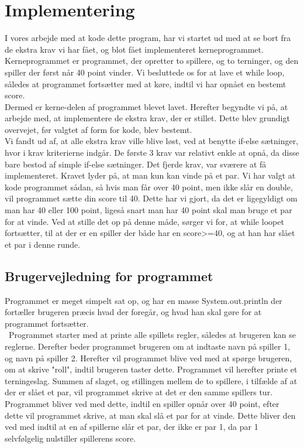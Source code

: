 \chapter{Implementering}
    I vores arbejde med at kode dette program, har vi startet ud med at 
    se bort fra de ekstra krav vi har fået, og blot fået implementeret kerneprogrammet.
    \\ Kerneprogrammet er programmet, der opretter to spillere, 
    og to terninger, og den spiller der først når 40 point vinder. 
    Vi besluttede os for at lave et while loop, således at programmet fortsætter med at køre,
    indtil vi har opnået en bestemt score.
    \\ Dermed er kerne-delen af programmet blevet lavet. 
    Herefter begyndte vi på, at arbejde med, at implementere de ekstra krav, der
    er stillet. 
    Dette blev grundigt overvejet, før valgtet af form for kode, blev bestemt.
    \\ Vi fandt ud af, at alle ekstra krav ville blive løst, ved at benytte if-else sætninger,
    hvor i krav kriterierne indgår.
    De første 3 krav var relativt enkle at opnå, da disse bare bestod af simple
    if-else sætninger.
    Det fjerde krav, var sværere at få implementeret. Kravet lyder på, at man kun kan vinde på et par.
    Vi har valgt at kode programmet sådan, så hvis man får over 40 point, 
    men ikke slår en double, vil programmet sætte din score til 40.
    Dette har vi gjort, da det er ligegyldigt om man har 40 eller 100 point,
    ligeså snart man har 40 point skal man bruge et par for at vinde.
    Ved at stille det op på denne måde, sørger vi for, at while loopet fortsætter,
    til at der er en spiller der både har en score>=40, og at han har slået et par
    i denne runde. \\

    \section{Brugervejledning for programmet}
    Programmet er meget simpelt sat op, og har en masse System.out.println
    der fortæller brugeren præcis hvad der foregår, og hvad han skal gøre for
    at programmet fortsætter. 
    \\ Programmet starter med at printe alle spillets regler,
    således at brugeren kan se reglerne. Derefter beder programmet brugeren om at
    indtaste navn på spiller 1, og navn på spiller 2. Herefter vil programmet
    blive ved med at spørge brugeren, om at skrive "roll", indtil brugeren taster dette.
    Programmet vil herefter printe et terningeslag. Summen af slaget,
    og stillingen mellem de to spillere, i tilfælde af at der er slået et par,
    vil programmet skrive at det er den samme spillers tur.
    Programmet bliver ved med dette, indtil en spiller opnår over 40 point,
    efter dette vil programmet skrive, at man skal slå et par for at vinde.
    Dette bliver den ved med indtil at en af spillerne slår et par, der ikke
    er par 1, da par 1 selvfølgelig nulstiller spillerens score.